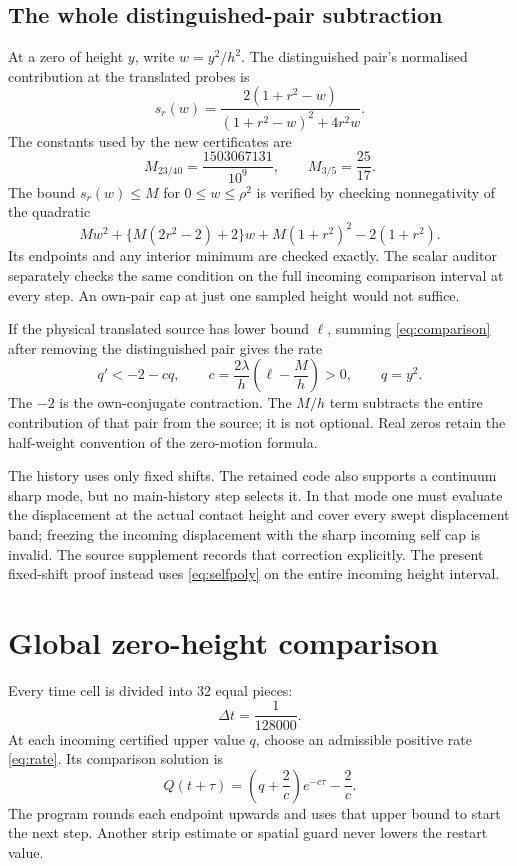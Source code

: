 \documentclass[11pt,a4paper]{article}
\theoremstyle{definition}\newtheorem{definition}[theorem]{Definition}
\theoremstyle{remark}\newtheorem{remark}[theorem]{Remark}
\begin{document}
\subsection{The whole distinguished-pair subtraction}
At a zero of height $y$, write $w=y^2/h^2$. The distinguished pair's
normalised contribution at the translated probes is
\begin{equation}\label{eq:self}
 s_r(w)=\frac{2(1+r^2-w)}{(1+r^2-w)^2+4r^2w}.
\end{equation}
The constants used by the new certificates are
\[
 M_{23/40}=\frac{1503067131}{10^9},\qquad M_{3/5}=\frac{25}{17}.
\]
The bound $s_r(w)\le M$ for $0\le w\le\rho^2$ is verified by checking
nonnegativity of the quadratic
\begin{equation}\label{eq:selfpoly}
 Mw^2+\{M(2r^2-2)+2\}w+M(1+r^2)^2-2(1+r^2).
\end{equation}
Its endpoints and any interior minimum are checked exactly. The scalar
auditor separately checks the same condition on the full incoming
comparison interval at every step. An own-pair cap at just one sampled
height would not suffice.

If the physical translated source has lower bound $\ell$, summing
\eqref{eq:comparison} after removing the distinguished pair gives the rate
\begin{equation}\label{eq:rate}
 q'<-2-cq,\qquad
 c=\frac{2\lambda}{h}\left(\ell-\frac Mh\right)>0,
 \qquad q=y^2.
\end{equation}
The $-2$ is the own-conjugate contraction. The $M/h$ term subtracts the
entire contribution of that pair from the source; it is not optional.
Real zeros retain the half-weight convention of the zero-motion formula.


The history uses only fixed shifts. The retained code also supports a
continuum sharp mode, but no main-history step selects it. In that mode
one must evaluate the displacement at the actual contact height and
cover every swept displacement band; freezing the incoming displacement
with the sharp incoming self cap is invalid. The source supplement records
that correction explicitly. The present fixed-shift proof instead uses
\eqref{eq:selfpoly} on the entire incoming height interval.

\section{Global zero-height comparison}\label{sec:comparison}
Every time cell is divided into 32 equal pieces:
\[
\Delta t=\frac1{128000}.
\]
At each incoming certified upper value $q$, choose an admissible positive
rate \eqref{eq:rate}. Its comparison solution is
\begin{equation}\label{eq:flow}
Q(t+\tau)=\left(q+\frac2c\right)e^{-c\tau}-\frac2c.
\end{equation}
The program rounds each endpoint upwards and uses that upper bound to
start the next step. Another strip estimate or spatial guard never lowers
the restart value.
\end{document}
